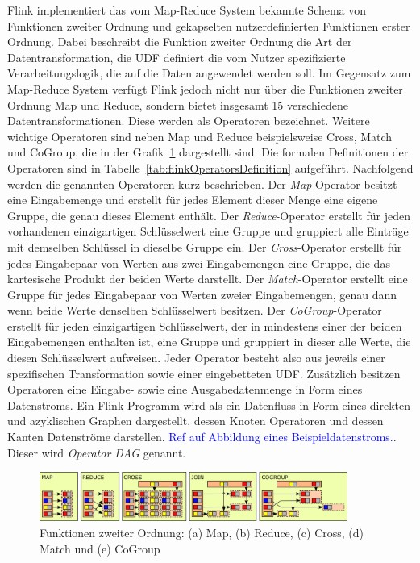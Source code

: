 Flink implementiert das vom Map-Reduce System bekannte Schema von Funktionen zweiter Ordnung und gekapselten nutzerdefinierten Funktionen erster Ordnung. Dabei beschreibt die Funktion zweiter Ordnung die Art der Datentransformation, die UDF definiert die vom Nutzer spezifizierte Verarbeitungslogik, die auf die Daten angewendet werden soll. Im Gegensatz zum Map-Reduce System verfügt Flink jedoch nicht nur über die Funktionen zweiter Ordnung Map und Reduce, sondern bietet insgesamt 15 verschiedene Datentransformationen. Diese werden als Operatoren bezeichnet. Weitere wichtige Operatoren sind neben Map und Reduce beispielsweise Cross, Match und CoGroup, die in der Grafik~\ref{graphicFlinkOperators} dargestellt sind. Die formalen Definitionen der Operatoren sind in Tabelle~\ref{tab:flinkOperatorsDefinition} aufgeführt. Nachfolgend werden die genannten Operatoren kurz beschrieben. Der \textit{Map}-Operator besitzt eine Eingabemenge und erstellt für jedes Element dieser Menge eine eigene Gruppe, die genau dieses Element enthält. Der \textit{Reduce}-Operator erstellt für jeden vorhandenen einzigartigen Schlüsselwert eine Gruppe und gruppiert alle Einträge mit demselben Schlüssel in dieselbe Gruppe ein. Der \textit{Cross}-Operator erstellt für jedes Eingabepaar von Werten aus zwei Eingabemengen eine Gruppe, die das kartesische Produkt der beiden Werte darstellt. Der \textit{Match}-Operator erstellt eine Gruppe für jedes Eingabepaar von Werten zweier Eingabemengen, genau dann wenn beide Werte denselben Schlüsselwert besitzen. Der \textit{CoGroup}-Operator erstellt für jeden einzigartigen Schlüsselwert, der in mindestens einer der beiden Eingabemengen enthalten ist, eine Gruppe und gruppiert in dieser alle Werte, die diesen Schlüsselwert aufweisen.
Jeder Operator besteht also aus jeweils einer spezifischen Transformation sowie einer eingebetteten UDF. Zusätzlich besitzen Operatoren eine Eingabe- sowie eine Ausgabedatenmenge in Form eines Datenstroms. Ein Flink-Programm wird als ein Datenfluss in Form eines direkten und azyklischen Graphen dargestellt, dessen Knoten Operatoren und dessen Kanten Datenströme darstellen. \textcolor{blue}{Ref auf Abbildung eines Beispieldatenstroms.}. Dieser wird \textit{Operator DAG} genannt. 

\begin{figure}[h]
	\centering	
	\captionsetup{justification=centering,margin=2cm}
	\includegraphics[width=0.9\textwidth]{picture/flink_operators.png}
	\caption{Funktionen zweiter Ordnung: (a) Map, (b) Reduce, (c) Cross, (d) Match und (e) CoGroup \cite{Hueske2012}}
	\label{graphicFlinkOperators}
\end{figure}

